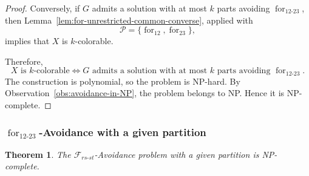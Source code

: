 \documentclass[12pt]{article}
\theoremstyle{plain}
\newtheorem{theorem}{Theorem}[section]
\theoremstyle{definition}
\theoremstyle{remark}
\theoremstyle{definition}
\newcommand{\forlabel}{\mathrm{for}}
\DeclareRobustCommand{\forparam}[1]{%
  \ensuremath{\mathop{\forlabel}\nolimits_{#1}}%
}
\begin{document}
\begin{proof}
Conversely, if \(G\) admits a solution with at most \(k\) parts
avoiding \(\forparam{12\text{-}23}\), then
Lemma~\ref{lem:for-unrestricted-common-converse}, applied with
\[
\mathcal P=\{\forparam{12},\forparam{23}\},
\]
implies that \(X\) is \(k\)-colorable.

Therefore,
\[
X\text{ is \(k\)-colorable}
\iff
G\text{ admits a solution with at most \(k\) parts avoiding }
\forparam{12\text{-}23}.
\]
The construction is polynomial, so the problem is NP-hard.
By Observation~\ref{obs:avoidance-in-NP}, the problem belongs to NP.
Hence it is NP-complete.
\end{proof}





\subsubsection{
\texorpdfstring{\(\forparam{12\text{-}23}\)-Avoidance with a given partition}
{for12-23-Avoidance with a given partition}
}
\label{subsubsec:for12-23-given-partition}





\begin{theorem}\label{thm:forrs-st-given-partition-np-complete}
The \(\mathcal F_{rs\text{-}st}\)-Avoidance problem with a given partition is NP-complete.
\end{theorem}
\end{document}
